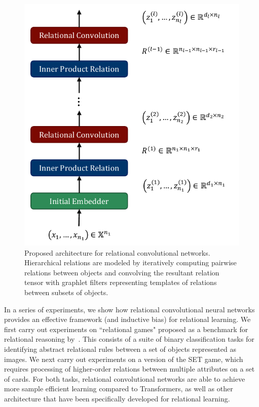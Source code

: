 \begin{figure}
    \vskip -20pt
    \centering
    \includegraphics[width=.5\textwidth]{figs/relconv_architecture.pdf}
    \vskip-5pt
    \caption{Proposed architecture for relational convolutional networks. Hierarchical relations are modeled by iteratively computing pairwise relations between objects and convolving the resultant relation tensor with graphlet filters representing templates of relations between subsets of objects.
    }\label{fig:relconv_architecture}
\end{figure}

In a series of experiments, we show how relational convolutional neural networks provides an effective framework (and inductive bias) for relational learning. We first carry out experiments on ``relational games" proposed as a benchmark for relational reasoning by~\citep{shanahanExplicitlyRelationalNeural}. This consists of a suite of binary classification tasks for identifying abstract relational rules between a set of objects represented as images. We next carry out experiments on a version of the SET game, which requires processing of  higher-order relations between multiple attributes on a set of cards. For both tasks, relational convolutional networks are able to achieve more sample efficient learning compared to Transformers, as well as other architecture that have been specifically developed for relational learning.


